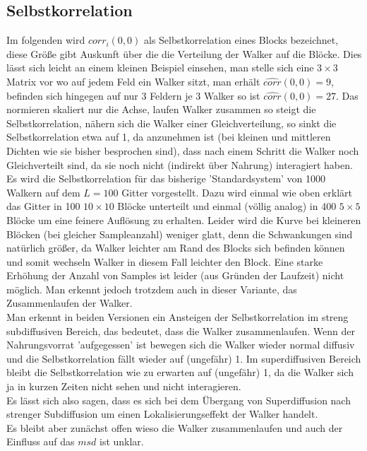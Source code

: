 \documentclass[a4paper, 12pt]{report}
\begin{document}
\subsection{Selbstkorrelation}
\noindent Im folgenden wird $corr_i(0,0)$ als Selbstkorrelation eines Blocks bezeichnet, diese Größe gibt Auskunft über die die Verteilung der Walker auf die Blöcke. Dies lässt sich leicht an einem kleinen Beispiel einsehen, man stelle sich eine $3\times 3$ Matrix vor wo auf jedem Feld ein Walker sitzt, man erhält $\hat{corr}(0,0)=9$, befinden sich hingegen auf nur 3 Feldern je 3 Walker so ist $\hat{corr}(0,0)=27$. Das normieren skaliert nur die Achse, laufen Walker zusammen so steigt die Selbstkorrelation, nähern sich die Walker einer Gleichverteilung, so sinkt die Selbstkorrelation etwa auf 1, da anzunehmen ist (bei kleinen und mittleren Dichten wie sie bisher besprochen sind), dass nach einem Schritt die Walker noch Gleichverteilt sind, da sie noch nicht (indirekt über Nahrung) interagiert haben.
\\
\noindent Es wird die Selbstkorrelation für das bisherige 'Standardsystem' von 1000 Walkern auf dem $L=100$ Gitter vorgestellt. Dazu wird einmal wie oben erklärt das Gitter in 100 $10\times 10$ Blöcke unterteilt und einmal (völlig analog) in 400 $5\times 5$ Blöcke um eine feinere Auflösung zu erhalten. Leider wird die Kurve bei kleineren Blöcken (bei gleicher Sampleanzahl) weniger glatt, denn die Schwankungen sind natürlich größer, da Walker leichter am Rand des Blocks sich befinden können und somit wechseln Walker in diesem Fall leichter den Block. Eine starke Erhöhung der Anzahl von Samples ist leider (aus Gründen der Laufzeit) nicht möglich. Man erkennt jedoch trotzdem auch in dieser Variante, das Zusammenlaufen der Walker. 
\\
\noindent Man erkennt in beiden Versionen ein Ansteigen der Selbstkorrelation im streng subdiffusiven Bereich, das bedeutet, dass die Walker zusammenlaufen. Wenn der Nahrungsvorrat 'aufgegessen' ist bewegen sich die Walker wieder normal diffusiv und die Selbstkorrelation fällt wieder auf (ungefähr) 1. Im superdiffusiven Bereich bleibt die Selbstkorrelation wie zu erwarten auf (ungefähr) 1, da die Walker sich ja in kurzen Zeiten nicht sehen und nicht interagieren.
\\
\noindent Es lässt sich also sagen, dass es sich bei dem Übergang von Superdiffusion nach strenger Subdiffusion um einen Lokalisierungseffekt der Walker handelt. 
\\
\noindent Es bleibt aber zunächst offen wieso die Walker zusammenlaufen und auch der Einfluss auf das $msd$ ist unklar.
\end{document}
